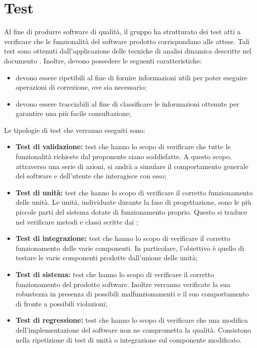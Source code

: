 \documentclass[PianoDiQualifica.tex]{subfiles}
\begin{document}
\section{Test}
Al fine di produrre software di qualità, il gruppo ha strutturato dei test atti a verificare che le funzionalità del software prodotto corrispondano alle attese.
Tali test sono ottenuti dall'applicazione delle tecniche di analisi dinamica descritte nel documento \NPdocRP{}. Inoltre, devono possedere le seguenti caratteristiche:
\begin{itemize}
	\item devono essere ripetibili al fine di fornire informazioni utili per poter eseguire operazioni di correzione, ove sia necessario;
	\item devono essere tracciabili al fine di classificare le informazioni ottenute per garantire una più facile consultazione;
\end{itemize}
Le tipologie di test che verranno eseguiti sono:
\begin{itemize}
\item \textbf{Test di validazione:} test che hanno lo scopo di verificare che tutte le funzionalità richieste dal proponente siano soddisfatte. A questo scopo, attraverso una serie di
azioni, si andrà a simulare il comportamento generale del software e dell'utente che interagisce con esso;
\item \textbf{Test di unità: } test che  hanno lo scopo di verificare il corretto funzionamento delle unità. Le unità, individuate durante la fase di progettazione, sono le
		più piccole parti del sistema dotate di funzionamento proprio. Questo si traduce nel verificare metodi e classi scritte dai \PRP{};
\item \textbf{Test di integrazione: } test che hanno lo scopo di verificare il corretto funzionamento delle varie componenti. In particolare, l'obiettivo è quello di testare le varie componenti prodotte dall'unione delle unità;
\item \textbf{Test di sistema: }test che hanno lo scopo di verificare il corretto funzionamento del prodotto software. Inoltre verranno verificate la sua robustezza in presenza di
		possibili malfunzionamenti e il suo comportamento di fronte a possibili violazioni;
\item \textbf{Test di regressione: } test che hanno lo scopo di verificare che una modifica dell'implementazione del software non ne comprometta la qualità. Consistono nella ripetizione di test di unità o integrazione sul componente modificato.			
\end{itemize}
\end{document}
